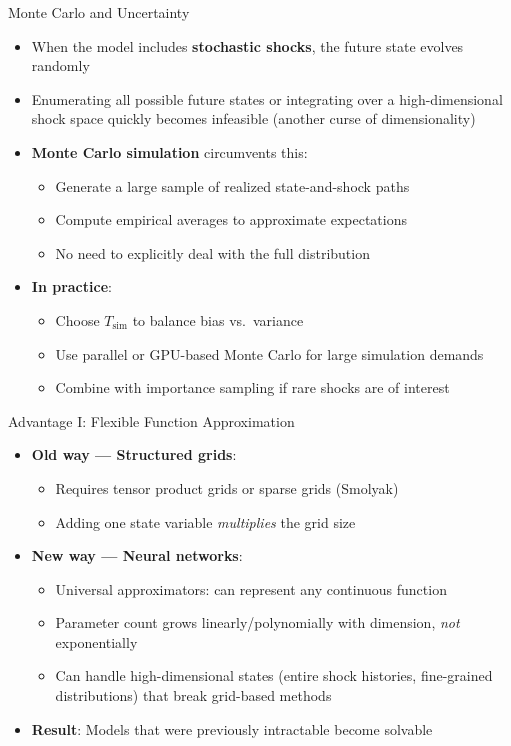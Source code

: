 \documentclass[10pt,english,aspectratio=169]{beamer}
\begin{document}
\begin{frame}{Monte Carlo and Uncertainty}
\begin{itemize}
  \item When the model includes \textbf{stochastic shocks}, the future state evolves randomly
  \item Enumerating all possible future states or integrating over a high-dimensional shock space quickly becomes infeasible (another curse of dimensionality)
  \medskip
  \item \textbf{Monte Carlo simulation} circumvents this:
    \begin{itemize}
      \item Generate a large sample of realized state-and-shock paths
      \item Compute empirical averages to approximate expectations
      \item No need to explicitly deal with the full distribution
    \end{itemize}
  \medskip
  \item \textbf{In practice}:
    \begin{itemize}
      \item Choose $T_{\text{sim}}$ to balance bias vs.\ variance
      \item Use parallel or GPU-based Monte Carlo for large simulation demands
      \item Combine with importance sampling if rare shocks are of interest
    \end{itemize}
\end{itemize}
\end{frame}

\begin{frame}{Advantage I: Flexible Function Approximation}
\begin{itemize}
  \item \textbf{Old way --- Structured grids}:
    \begin{itemize}
      \item Requires tensor product grids or sparse grids (Smolyak)
      \item Adding one state variable \emph{multiplies} the grid size
    \end{itemize}
  \medskip
  \item \textbf{New way --- Neural networks}:
    \begin{itemize}
      \item Universal approximators: can represent any continuous function
      \item Parameter count grows linearly/polynomially with dimension, \emph{not} exponentially
      \item Can handle high-dimensional states (entire shock histories, fine-grained distributions) that break grid-based methods
    \end{itemize}
  \medskip
  \item \textbf{Result}: Models that were previously intractable become solvable
\end{itemize}
\end{frame}
\end{document}
